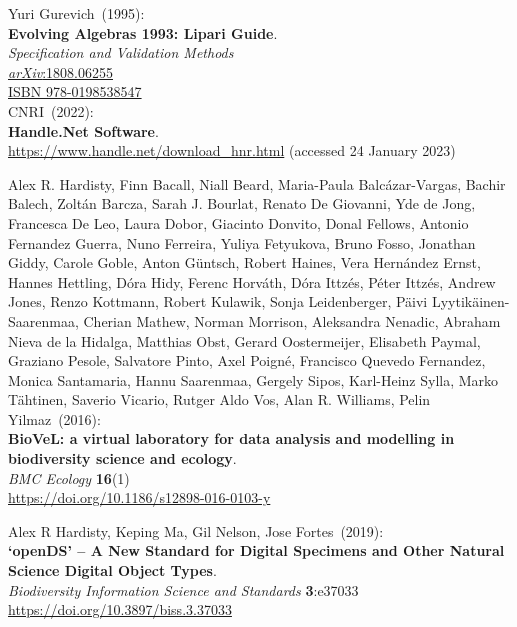 \begin{thebibliography}{9}
Yuri Gurevich~(1995):\\
\textbf{Evolving Algebras 1993: Lipari Guide}.\\
\emph{Specification and Validation Methods} \\
\href{https://doi.org/10.48550/arXiv.1808.06255}{\emph{arXiv}:1808.06255} \\
\href{https://identifiers.org/isbn/9780198538547}{ISBN 978-0198538547} \\

CNRI~(2022): \\
\textbf{Handle.Net Software}. \\
\url{https://www.handle.net/download_hnr.html} (accessed 24 January 2023)

Alex R. Hardisty, Finn Bacall, Niall Beard, Maria-Paula Balcázar-Vargas, Bachir Balech, Zoltán Barcza, Sarah J. Bourlat, Renato De Giovanni, Yde de Jong, Francesca De Leo, Laura Dobor, Giacinto Donvito, Donal Fellows, Antonio Fernandez Guerra, Nuno Ferreira, Yuliya Fetyukova, Bruno Fosso, Jonathan Giddy, Carole Goble, Anton Güntsch, Robert Haines, Vera Hernández Ernst, Hannes Hettling, Dóra Hidy, Ferenc Horváth, Dóra Ittzés, Péter Ittzés, Andrew Jones, Renzo Kottmann, Robert Kulawik, Sonja Leidenberger, Päivi Lyytikäinen-Saarenmaa, Cherian Mathew, Norman Morrison, Aleksandra Nenadic, Abraham Nieva de la Hidalga, Matthias Obst, Gerard Oostermeijer, Elisabeth Paymal, Graziano Pesole, Salvatore Pinto, Axel Poigné, Francisco Quevedo Fernandez, Monica Santamaria, Hannu Saarenmaa, Gergely Sipos, Karl-Heinz Sylla, Marko Tähtinen, Saverio Vicario, Rutger Aldo Vos, Alan R. Williams, Pelin Yilmaz~(2016): \\
\textbf{BioVeL: a virtual laboratory for data analysis and modelling in biodiversity science and ecology}.\\
\emph{BMC Ecology} \textbf{16}(1)\\
\url{https://doi.org/10.1186/s12898-016-0103-y}

Alex R Hardisty, Keping Ma, Gil Nelson, Jose Fortes~(2019): \\
\textbf{`openDS' -- A New Standard for Digital Specimens and Other Natural Science Digital Object Types}.\\
\emph{Biodiversity Information Science and Standards}
\textbf{3}:e37033\\
\url{https://doi.org/10.3897/biss.3.37033}


\end{thebibliography}
